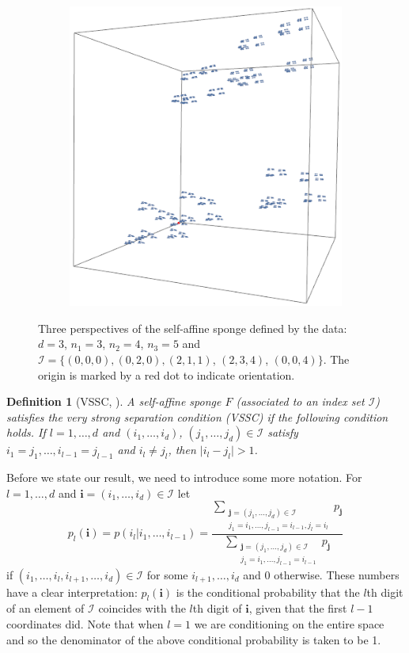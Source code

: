 \documentclass[12pt]{amsart}
\numberwithin{equation}{section}
\newtheorem{defn}[thm]{Definition}
\begin{document}
\begin{figure}[h]
\begin{subfigure}{0.35\textwidth}
  \centering
  \includegraphics[width=0.85\linewidth]{sponge13.png}
  \label{fig:sub2}
\end{subfigure}
\caption{Three perspectives of the self-affine sponge defined by the data: $d=3$,  $n_1=3$, $n_2=4$, $n_3=5$ and  $\mathcal{I} = \{ (0,0,0),(0,2,0),(2,1,1)$, $(2,3,4)$, $(0,0,4) \}$. The origin is marked by a red dot to indicate orientation.}
\label{fig:test}
\end{figure}

\begin{defn}[VSSC, \cite{sponges}]
\emph{A self-affine sponge }$F$\emph{ (associated to an index set }$\mathcal{I}$)\emph{ satisfies the }very strong separation condition (VSSC)\emph{ if the following condition  holds. If }$l=1, \ldots, d$\emph{ and }$(i_1, \ldots, i_d)$, $(j_1 ,\ldots, j_d)\in \mathcal{I}$\emph{ satisfy }$i_1=j_1, \ldots,  i_{l-1}=j_{l-1}$\emph{ and }$i_l \neq j_l$,\emph{ then }$\lvert i_l - j_l \rvert >1$.
\end{defn} 

Before we state our result, we need to introduce some more notation.  For $l=1, \dots, d$ and $\textbf{i}=(i_1, \ldots, i_d)\in \mathcal{I} $  let 
\[
p_l(\mathbf{i})=p (i_l \vert i_1, \ldots , i_{l-1})=\frac{\displaystyle\sum_{\substack{\textbf{j}=\left( j_1, \ldots, j_d\right)\in \mathcal{I} \\ j_1=i_1, \ldots, j_{l-1}=i_{l-1}, j_l=i_l}}p_{\textbf{j}}}{\displaystyle\sum_{\substack{\textbf{j}=\left( j_1, \ldots, j_d\right)\in \mathcal{I} \\ j_1=i_1, \ldots, j_{l-1}=i_{l-1}}}p_{\textbf{j}}}
\]
if $(i_1, \ldots, i_l, i_{l+1},\ldots, i_d) \in \mathcal{I}$ for some $i_{l+1},\ldots, i_d$ and $0$ otherwise.  These numbers have a clear interpretation: $p_l(\mathbf{i})$ is the conditional probability that the $l$th digit of an element of $\mathcal{I}$  coincides with the $l$th digit of $\mathbf{i}$, given that the first $l-1$ coordinates did.  Note that when $l=1$ we are conditioning on the entire space and so the denominator of the above conditional probability is taken to be 1.
\end{document}
